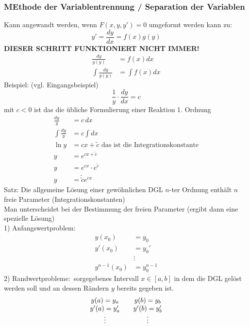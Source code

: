 \documentclass{article}
\begin{document}
\subsubsection{MEthode der Variablentrennung / Separation der Variablen}
Kann angewandt werden, wenn $F(x,y,y') = 0$ umgeformt werden kann zu:
\begin{equation*}
    y' = \frac{dy}{dx} = f(x)g(y)
\end{equation*}
\textbf{DIESER SCHRITT FUNKTIONIERT NICHT IMMER!}
\begin{align*}
    \frac{dy}{g(y)}&=f(x)dx\\
    \int \frac{dy}{g(y)}&=\int f(x)dx
\end{align*}
Beispiel: (vgl. Eingangsbeispiel)
\begin{equation*}
    \frac{1}{y}\cdot \frac{dy}{dx} = c
\end{equation*}
mit $c<0$ ist das die übliche Formulierung einer Reaktion 1. Ordnung
\begin{align*}
    \frac{dy}{y} &= c\,dx\\
    \int \frac{dy}{y} &= c \int dx\\ 
    \ln y &= cx + \tilde{c} \text{ das ist die Integrationskonstante}\\
    y &= e^{cx+\tilde{c}}\\
    y &= e^{cx}\cdot e^{\tilde{c}}\\
    y &= \tilde{\tilde{c}}e^{cx}
\end{align*}
Satz: Die allgemeine Lösung einer gewöhnlichen DGL $n$-ter Ordnung enthält $n$ freie Parameter (Integrationskonstanten)\\
Man unterscheidet bei der Bestimmung der freien Parameter (ergibt dann eine spezielle Lösung) \\
1) Anfangswertproblem:
\begin{align*}
    y(x_0) &= y_0\\
    y'(x_0) &= y_0'\\
    &\vdots\\
    y^{n-1}(x_0)&=y_0^{n-1}
\end{align*}
2) Randwertprobleme:\
sorgegebenes Intervall $x \in [a,b]$ in dem die DGL gelöst werden soll und an dessen Rändern $y$ bereits gegeben ist.\\
\begin{equation*}
    \begin{array}{c c c}
        y(a)=y_a & & y(b)=y_b\\
        y'(a)=y'_a & & y'(b)=y'_b\\
        \vdots && \vdots\\ 
    \end{array}
\end{equation*}
\end{document}
